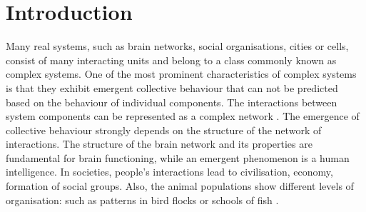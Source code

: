 \chapter{Introduction} %








Many real systems, such as brain networks, social organisations, cities or cells, consist of many interacting units and belong to a class commonly known as complex systems. One of the most prominent characteristics of complex systems is that they exhibit emergent collective behaviour that can not be predicted based on the behaviour of individual components. The interactions between system components can be represented as a complex network \cite{kwapien2012}. The emergence of collective behaviour strongly depends on the structure of the network of interactions. The structure of the brain network and its properties are fundamental for brain functioning, while an emergent phenomenon is a human intelligence. In societies, people's interactions lead to civilisation, economy, formation of social groups. %
Also, the animal populations show different levels of organisation: such as patterns in bird flocks or schools of fish \cite{thurner2018}.

